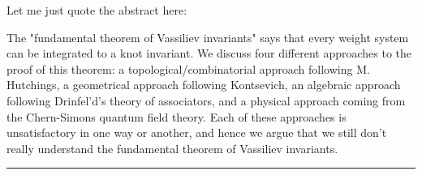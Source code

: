 Let me just quote the abstract here:

  The "fundamental theorem of Vassiliev invariants" says that every weight
system can be integrated to a knot invariant. We discuss four different
approaches to the proof of this theorem: a topological/combinatorial approach
following M. Hutchings, a geometrical approach following Kontsevich, an
algebraic approach following Drinfel'd's theory of associators, and a physical
approach coming from the Chern-Simons quantum field theory. Each of these
approaches is unsatisfactory in one way or another, and hence we argue that we
still don't really understand the fundamental theorem of Vassiliev invariants.

\par\noindent\rule{\textwidth}{0.4pt}

